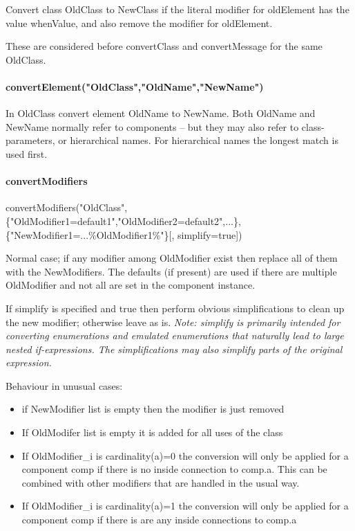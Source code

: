 \documentclass[10pt,a4paper]{report}
\def\doublelabel#1{\label{#1}\hypertarget{#1}{}}
\begin{document}
Convert class OldClass to NewClass if the literal modifier for
oldElement has the value whenValue, and also remove the modifier for
oldElement.

These are considered before convertClass and convertMessage for the same
OldClass.

\paragraph{convertElement("OldClass","OldName","NewName")}\doublelabel{convertelementoldclassoldnamenewname}

In OldClass convert element OldName to NewName. Both OldName and NewName
normally refer to components -- but they may also refer to
class-parameters, or hierarchical names. For hierarchical names the
longest match is used first.

\paragraph{convertModifiers}\doublelabel{convertmodifiers}

convertModifiers("OldClass",\{"OldModifier1=default1","OldModifier2=default2",...\},\{"NewModifier1=...\%OldModifier1\%"\}{[}, simplify=true{]})

Normal case; if any modifier among OldModifier exist then replace all of
them with the NewModifiers. The defaults (if present) are used if there
are multiple OldModifier and not all are set in the component instance.

If simplify is specified and true then perform obvious simplifications
to clean up the new modifier; otherwise leave as is. \emph{Note:
simplify is primarily intended for converting enumerations and emulated
enumerations that naturally lead to large nested if-expressions. The
simplifications may also simplify parts of the original expression.}

Behaviour in unusual cases:

\begin{itemize}
\item
  if NewModifier list is empty then the modifier is just removed
\item
  If OldModifer list is empty it is added for all uses of the class
\item
  If OldModifier\_i is cardinality(a)=0 the conversion will only be
  applied for a component comp if there is no inside connection to
  comp.a. This can be combined with other modifiers that are handled in
  the usual way.
\item
  If OldModifier\_i is cardinality(a)=1 the conversion will only be
  applied for a component comp if there is are any inside connections to
  comp.a
\end{itemize}
\end{document}
